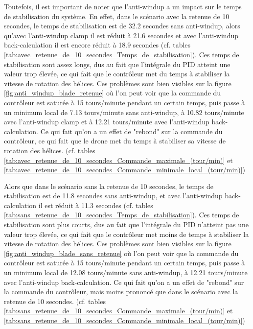 Toutefois, il est important de noter que l'anti-windup a un impact sur le temps de stabilisation du système. En effet, dans le scénario avec la retenue de 10 secondes, le temps de stabilisation est de 32.2 secondes sans anti-windup, alors qu'avec l'anti-windup clamp il est réduit à 21.6 secondes et avec l'anti-windup back-calculation il est encore réduit à 18.9 secondes (cf. tables \ref{tab:avec_retenue_de_10_secondes_Temps_de_stabilisation}). 
Ces temps de stabilisation sont assez longs, dus au fait que l'intégrale du PID atteint une valeur trop élevée, ce qui fait que le contrôleur met du temps à stabiliser la vitesse de rotation des hélices. Ces problèmes sont bien visibles sur la figure \ref{fig:anti_windup_blade_retenue} où l'on peut voir que la commande du contrôleur est saturée à 15 tours/minute pendant un certain temps, puis passe à un minimum local de 7.13 tours/minute sans anti-windup, à 10.82 tours/minute avec l'anti-windup clamp et à 12.21 tours/minute avec l'anti-windup back-calculation. Ce qui fait qu'on a un effet de "rebond" sur la commande du contrôleur, ce qui fait que le drone met du temps à stabiliser sa vitesse de rotation des hélices. (cf. tables \ref{tab:avec_retenue_de_10_secondes_Commande_maximale_(tour/min)} et \ref{tab:avec_retenue_de_10_secondes_Commande_minimale_local_(tour/min)})\\

\newpage

Alors que dans le scénario sans la retenue de 10 secondes, le temps de stabilisation est de 11.8 secondes sans anti-windup, et avec l'anti-windup back-calculation il est réduit à 11.3 secondes (cf. tables \ref{tab:sans_retenue_de_10_secondes_Temps_de_stabilisation}). Ces temps de stabilisation sont plus courts, dus au fait que l'intégrale du PID n'atteint pas une valeur trop élevée, ce qui fait que le contrôleur met moins de temps à stabiliser la vitesse de rotation des hélices. 
Ces problèmes sont bien visibles sur la figure \ref{fig:anti_windup_blade_sans_retenue} où l'on peut voir que la commande du contrôleur est saturée à 15 tours/minute pendant un certain temps, puis passe à un minimum local de 12.08 tours/minute sans anti-windup, à 12.21 tours/minute avec l'anti-windup back-calculation. Ce qui fait qu'on a un effet de "rebond" sur la commande du contrôleur, mais moins prononcé que dans le scénario avec la retenue de 10 secondes. (cf. tables \ref{tab:sans_retenue_de_10_secondes_Commande_maximale_(tour/min)} et \ref{tab:sans_retenue_de_10_secondes_Commande_minimale_local_(tour/min)})\\

